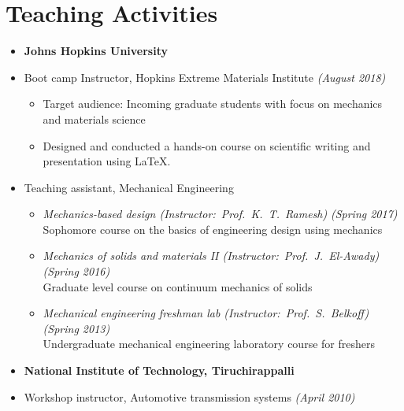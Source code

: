 \documentclass[a4paper,10pt, oneside]{article}
\begin{document}
	\section*{{Teaching Activities}}
	\begin{itemize}[wide, labelwidth=!, labelindent=-1em]
		\item[]\textbf{Johns Hopkins University}
		\item[]Boot camp Instructor, Hopkins Extreme Materials Institute \hfill \textit{(August 2018)}
		\begin{itemize}[wide, labelwidth=!, labelindent=0em]
			\item Target audience: Incoming graduate students with focus on mechanics and materials science
			\item Designed and conducted a hands-on course on scientific writing and presentation using \LaTeX.
		\end{itemize}
		\vspace*{0.5em}
		\item[]Teaching assistant, Mechanical Engineering
		\begin{itemize}[wide, labelwidth=!, labelindent=0em]
			\item \textit{Mechanics-based design ({Instructor}:~Prof.~K.~T.~Ramesh)} \hfill \textit{(Spring 2017)} \\
			Sophomore course on the basics of engineering design using mechanics
			\item \textit{Mechanics of solids and materials II (Instructor:~Prof.~J.~El-Awady)} \hfill \textit{(Spring 2016)} \\
			Graduate level course on continuum mechanics of solids
			\item \textit{Mechanical engineering freshman lab (Instructor:~Prof.~S.~Belkoff)} \hfill \textit{(Spring 2013)} \\
			Undergraduate mechanical engineering laboratory course for freshers
		\end{itemize}
		\vspace*{0.5em}
		\item[]\textbf{National Institute of Technology, Tiruchirappalli}
		\item[]Workshop instructor, Automotive transmission systems \hfill \textit{(April 2010)}
	\end{itemize}
	
\end{document}
